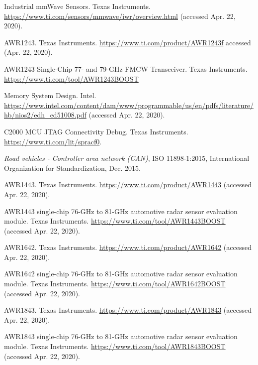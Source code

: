 \documentclass[11pt]{IEEEtran}
\begin{document}
\begin{thebibliography}{00}
				 Industrial mmWave Sensors. Texas Instruments. \url{https://www.ti.com/sensors/mmwave/iwr/overview.html} (accessed Apr. 22, 2020).

				 AWR1243. Texas Instruments. \url{https://www.ti.com/product/AWR1243f} accessed (Apr. 22, 2020).

				 AWR1243 Single-Chip 77- and 79-GHz FMCW Transceiver. Texas Instruments. \url{https://www.ti.com/tool/AWR1243BOOST}

				 Memory System Design. Intel. \url{https://www.intel.com/content/dam/www/programmable/us/en/pdfs/literature/hb/nios2/edh_ed51008.pdf} (accessed Apr. 22, 2020).

				 C2000 MCU JTAG Connectivity Debug. Texas Instruments. \url{https://www.ti.com/lit/spracf0}.

				 \textit{Road vehicles - Controller area network (CAN)}, ISO 11898-1:2015, International Organization for Standardization, Dec. 2015.

				 AWR1443. Texas Instruments. \url{https://www.ti.com/product/AWR1443} (accessed Apr. 22, 2020).

				 AWR1443 single-chip 76-GHz to 81-GHz automotive radar sensor evaluation module. Texas Instruments. \url{https://www.ti.com/tool/AWR1443BOOST} (accessed Apr. 22, 2020).

				 AWR1642. Texas Instruments. \url{https://www.ti.com/product/AWR1642} (accessed Apr. 22, 2020).

				 AWR1642 single-chip 76-GHz to 81-GHz automotive radar sensor evaluation module. Texas Instruments. \url{https://www.ti.com/tool/AWR1642BOOST} (accessed Apr. 22, 2020).

				 AWR1843. Texas Instruments. \url{https://www.ti.com/product/AWR1843} (accessed Apr. 22, 2020).

				 AWR1843 single-chip 76-GHz to 81-GHz automotive radar sensor evaluation module. Texas Instruments. \url{https://www.ti.com/tool/AWR1843BOOST} (accessed Apr. 22, 2020).
	\end{thebibliography}
\end{document}
